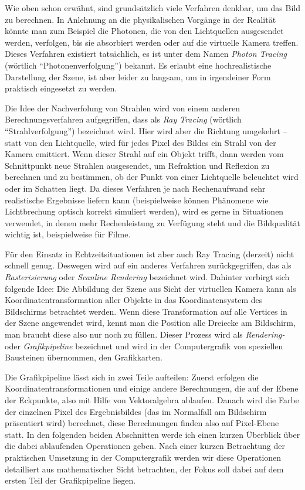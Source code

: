 Wie oben schon erwähnt, sind grundsätzlich viele Verfahren denkbar, um das Bild zu berechnen. In Anlehnung an die physikalischen Vorgänge in der Realität könnte man zum Beispiel die Photonen, die von den Lichtquellen ausgesendet werden, verfolgen, bis sie absorbiert werden oder auf die virtuelle Kamera treffen. Dieses Verfahren existiert tatsächlich, es ist unter dem Namen \emph{Photon Tracing} (wörtlich \enquote{Photonenverfolgung}) bekannt. Es erlaubt eine hochrealistische Darstellung der Szene, ist aber leider zu langsam, um in irgendeiner Form praktisch eingesetzt zu werden.

Die Idee der Nachverfolung von Strahlen wird von einem anderen Berechnungsverfahren aufgegriffen, dass als \emph{Ray Tracing} (wörtlich \enquote{Strahlverfolgung}) bezeichnet wird. Hier wird aber die Richtung umgekehrt -- statt von den Lichtquelle, wird für jedes Pixel des Bildes ein Strahl von der Kamera emittiert. Wenn dieser Strahl auf ein Objekt trifft, dann werden vom Schnittpunkt neue Strahlen ausgesendet, um Refraktion und Reflexion zu berechnen und zu bestimmen, ob der Punkt von einer Lichtquelle beleuchtet wird oder im Schatten liegt. Da dieses Verfahren je nach Rechenaufwand sehr realistische Ergebnisse liefern kann (beispielweise können Phänomene wie Lichtbrechung optisch korrekt simuliert werden), wird es gerne in Situationen verwendet, in denen mehr Rechenleistung zu Verfügung steht und die Bildqualität wichtig ist, beispielweise für Filme.

Für den Einsatz in Echtzeitsituationen ist aber auch Ray Tracing (derzeit) nicht schnell genug. Deswegen wird auf ein anderes Verfahren zurückgegriffen, das als \emph{Rasterisierung} oder \emph{Scanline Rendering} bezeichnet wird. Dahinter verbirgt sich folgende Idee: Die Abbildung der Szene aus Sicht der virtuellen Kamera kann als Koordinatentransformation aller Objekte in das Koordinatensystem des Bildschirms betrachtet werden. Wenn diese Transformation auf alle Vertices in der Szene angewendet wird, kennt man die Position alle Dreiecke am Bildschirm, man braucht diese also nur noch zu füllen. Dieser Prozess wird als \emph{Rendering-} oder \emph{Grafikpipeline} bezeichnet und wird in der Computergrafik von speziellen Bausteinen übernommen, den Grafikkarten.

Die Grafikpipeline lässt sich in zwei Teile aufteilen: Zuerst erfolgen die Koordinatentransformationen und einige andere Berechnungen, die auf der Ebene der Eckpunkte, also mit Hilfe von Vektoralgebra ablaufen. Danach wird die Farbe der einzelnen Pixel des Ergebnisbildes (das im Normalfall am Bildschirm präsentiert wird) berechnet, diese Berechnungen finden also auf Pixel-Ebene statt.
In den folgenden beiden Abschnitten werde ich einen kurzen Überblick über die dabei ablaufenden Operationen geben. Nach einer kurzen Betrachtung der praktischen Umsetzung in der Computergrafik werden wir diese Operationen detailliert aus mathematischer Sicht betrachten, der Fokus soll dabei auf dem ersten Teil der Grafikpipeline liegen.

